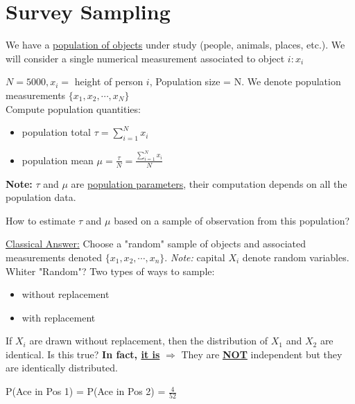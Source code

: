 \section*{Survey Sampling}
We have a \underline{population of objects} under study (people, animals, places, etc.). We will consider a single numerical measurement associated to object $i: x_i$
\begin{example}
	$N = 5000, x_i=$ height of person $i$, Population size = N. We denote population measurements $\{x_1, x_2, \cdots, x_N\}$\\
	Compute population quantities:
	\begin{multicols}{2}
		\begin{itemize}
		\item population total $\tau = \sum\limits_{i=1}^N x_i$
		\item population mean $\mu = \frac{\tau}{N}= \frac{\sum\limits_{i=1}^N x_i}{N}$
	\end{itemize}
	\end{multicols}

\end{example}
\textbf{Note: } $\tau$ and $\mu$ are \underline{population parameters}, their computation depends on all the population data.
\begin{question}
	 How to estimate $\tau$ and $\mu$ based on a sample of observation from this population?
\end{question}
\underline{Classical Answer:} Choose a "random" sample of objects and associated measurements denoted $\{x_1, x_2, \cdots, x_n \}$. \emph{Note: } capital $X_i$ denote random variables.\\
Whiter "Random"? Two types of ways to sample:
\begin{multicols}{2}
	\begin{itemize}[label={--}]
	\item without replacement
	\item with replacement
\end{itemize}
\end{multicols}
\begin{claim-N}
	If $X_i$ are drawn without replacement, then the distribution of $X_1$ and $X_2$ are identical. Is this true? \textbf{In fact, \underline{\Large it is}} $\Rightarrow$ They are \textbf{\underline{\large NOT}} independent but they are identically distributed.
\end{claim-N}
\begin{center}
	P(Ace in Pos 1) = P(Ace in Pos 2) = $\frac{4}{52}$
\end{center}
